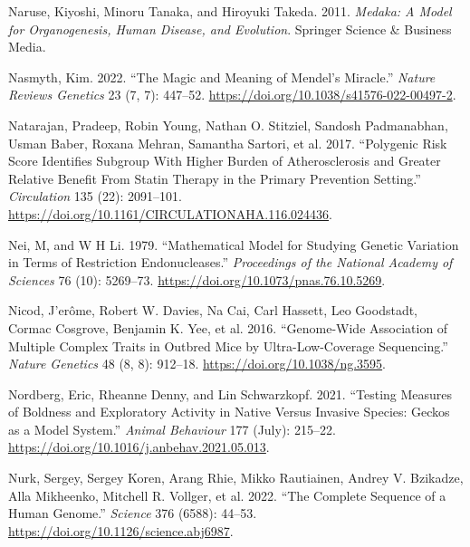 \documentclass[
]{book}
\newlength{\cslhangindent}
\newlength{\cslentryspacingunit} %
\newenvironment{CSLReferences}[2] %
 {%
  \setlength{\parindent}{0pt}
  \ifodd #1
  \let\oldpar\par
  \def\par{\hangindent=\cslhangindent\oldpar}
  \fi
  \setlength{\parskip}{#2\cslentryspacingunit}
 }%
 {}
\begin{document}
\begin{CSLReferences}{1}{0}
\leavevmode{}%
Naruse, Kiyoshi, Minoru Tanaka, and Hiroyuki Takeda. 2011. \emph{Medaka: A Model for Organogenesis, Human Disease, and Evolution}. {Springer Science \& Business Media}.

\leavevmode{}%
Nasmyth, Kim. 2022. {``The Magic and Meaning of {Mendel}'s Miracle.''} \emph{Nature Reviews Genetics} 23 (7, 7): 447--52. \url{https://doi.org/10.1038/s41576-022-00497-2}.

\leavevmode{}%
Natarajan, Pradeep, Robin Young, Nathan O. Stitziel, Sandosh Padmanabhan, Usman Baber, Roxana Mehran, Samantha Sartori, et al. 2017. {``Polygenic {Risk Score Identifies Subgroup With Higher Burden} of {Atherosclerosis} and {Greater Relative Benefit From Statin Therapy} in the {Primary Prevention Setting}.''} \emph{Circulation} 135 (22): 2091--101. \url{https://doi.org/10.1161/CIRCULATIONAHA.116.024436}.

\leavevmode{}%
Nei, M, and W H Li. 1979. {``Mathematical Model for Studying Genetic Variation in Terms of Restriction Endonucleases.''} \emph{Proceedings of the National Academy of Sciences} 76 (10): 5269--73. \url{https://doi.org/10.1073/pnas.76.10.5269}.

\leavevmode{}%
Nicod, J'erôme, Robert W. Davies, Na Cai, Carl Hassett, Leo Goodstadt, Cormac Cosgrove, Benjamin K. Yee, et al. 2016. {``Genome-Wide Association of Multiple Complex Traits in Outbred Mice by Ultra-Low-Coverage Sequencing.''} \emph{Nature Genetics} 48 (8, 8): 912--18. \url{https://doi.org/10.1038/ng.3595}.

\leavevmode{}%
Nordberg, Eric, Rheanne Denny, and Lin Schwarzkopf. 2021. {``Testing Measures of Boldness and Exploratory Activity in Native Versus Invasive Species: Geckos as a Model System.''} \emph{Animal Behaviour} 177 (July): 215--22. \url{https://doi.org/10.1016/j.anbehav.2021.05.013}.

\leavevmode{}%
Nurk, Sergey, Sergey Koren, Arang Rhie, Mikko Rautiainen, Andrey V. Bzikadze, Alla Mikheenko, Mitchell R. Vollger, et al. 2022. {``The Complete Sequence of a Human Genome.''} \emph{Science} 376 (6588): 44--53. \url{https://doi.org/10.1126/science.abj6987}.


\end{CSLReferences}
\end{document}
